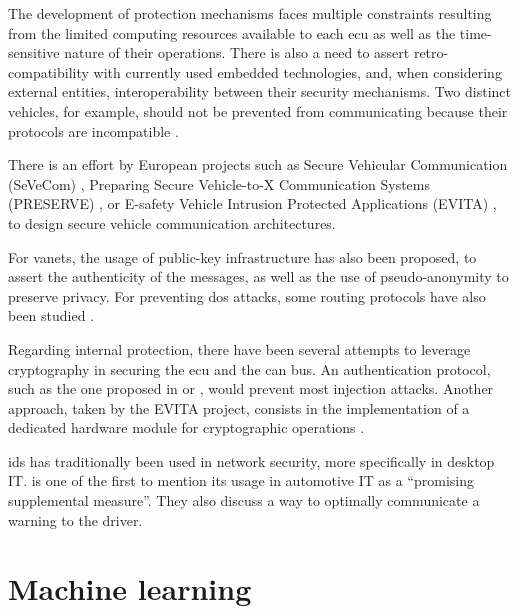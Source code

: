 The development of protection mechanisms faces multiple constraints resulting from the limited computing resources available to each \gls{ecu} as well as the time-sensitive nature of their operations. There is also a need to assert retro-compatibility with currently used embedded technologies, and, when considering external entities, interoperability between their security mechanisms. Two distinct vehicles, for example, should not be prevented from communicating because their protocols are incompatible \citep{Studnia2013}.\par
There is an effort by European projects such as Secure Vehicular Communication (SeVeCom) \citep{Kargl2008}, Preparing Secure Vehicle-to-X Communication Systems (PRESERVE) \citep{PRESERVE}, or E-safety Vehicle Intrusion Protected Applications (EVITA) \citep{EVITA}, to design secure vehicle communication architectures.\par
For \glspl{vanet}, the usage of public-key infrastructure has also been proposed, to assert the authenticity of the messages, as well as the use of pseudo-anonymity to preserve privacy. For preventing \gls{dos} attacks, some routing protocols have also been studied \citep{Hasrouny2017}.\par
Regarding internal protection, there have been several attempts to leverage cryptography in securing the \gls{ecu} and the \gls{can} bus. An authentication protocol, such as the one proposed in \citep{Herrewege2011} or \citep{Groza2018}, would prevent most injection attacks. Another approach, taken by the EVITA project, consists in the implementation of a dedicated hardware module for cryptographic operations \citep{Wolf2011}.\par
\gls{ids} has traditionally been used in network security, more specifically in desktop IT. \citep{hoppe2009applying} is one of the first to mention its usage in automotive IT as a “promising supplemental measure”. They also discuss a way to optimally communicate a warning to the driver.

\section{Machine learning}

